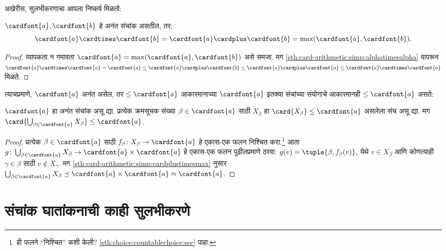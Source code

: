 अखेरीस, सुलभीकरणाचा आपला निष्कर्ष मिळतो:

\begin{thm}\label{sth:card-arithmetic:simp:cardplustimesmax}
$\cardfont{a}, \cardfont{b}$ हे अनंत संचांक असतील, तर:
\[
  \cardfont{a}
\cardtimes \cardfont{b} = \cardfont{a} \cardplus \cardfont{b} =
\text{max}(\cardfont{a}, \cardfont{b}).
\]
\end{thm}

\begin{proof}
व्यापकता न गमावता $\cardfont{a} = \max(\cardfont{a},
\cardfont{b})$ असे समजा. मग \ref{sth:card-arithmetic:simp:alphatimesalpha} वापरून
$\cardfont{a}\cardtimes\cardfont{a} = \cardfont{a} \leq \cardfont{a}
\cardplus \cardfont{b} \leq \cardfont{a} \cardplus \cardfont{a} \leq
\cardfont{a} \cardtimes \cardfont{a}$ मिळते. \end{proof}\noindent त्याचप्रमाणे,
$\cardfont{a}$ अनंत असेल, तर $\leq\cardfont{a}$ आकारमानाच्या $\cardfont{a}$ इतक्या संचांच्या संयोगाचे आकारमानही $\leq\cardfont{a}$ असते:

\begin{prop}\label{sth:card-arithmetic:simp:kappaunionkappasize}
$\cardfont{a}$ हा अनंत संचांक असू द्या. प्रत्येक क्रमसूचक संख्या $\beta
\in \cardfont{a}$ साठी $X_\beta$ हा $\card{X_\beta} \leq
\cardfont{a}$ असलेला संच असू द्या. मग $\card{\bigcup_{\beta \in \cardfont{a}} X_\beta}
\leq \cardfont{a}$.
\end{prop}

\begin{proof}
प्रत्येक $\beta \in \cardfont{a}$ साठी $f_\beta \colon
X_\beta \to \cardfont{a}$ हे एकास-एक फलन निश्चित करा.\footnote{ही फलने “निश्चित” कशी केली? \ref{sth:choice:countablechoice:sec} पाहा.} आता $g \colon
\bigcup_{\beta \in \cardfont{a}} X_\beta \to \cardfont{a} \times
\cardfont{a}$ हे एकास-एक फलन पुढीलप्रमाणे ठरवा: $g(v) = \tuple{\beta, f_\beta(v)}$, येथे $v \in
X_\beta$ आणि कोणत्याही $\gamma \in \beta$ साठी $v \notin X_\gamma$. मग
\ref{sth:card-arithmetic:simp:cardplustimesmax} नुसार
$\bigcup_{\beta \in \cardfont{a}} X_\beta \preceq \cardfont{a} \times
\cardfont{a} \approx \cardfont{a}$.
\end{proof}







\section{संचांक घातांकनाची काही सुलभीकरणे}\label{sth:card-arithmetic:expotough:sec}

